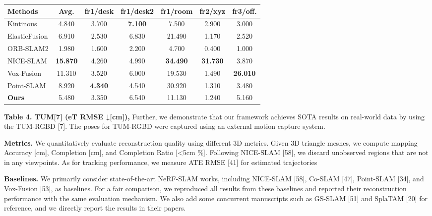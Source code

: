 \documentclass[twocolumn]{article} %
\begin{document}
\begin{table}[htbp]
\centering
\begin{adjustbox}{max width=\columnwidth,max height=!,center}
\begin{tabular}{lcccccc}
\toprule
\textbf{Methods} & \textbf{Avg.} & \textbf{fr1/desk} & \textbf{fr1/desk2} & \textbf{fr1/room} & \textbf{fr2/xyz} & \textbf{fr3/off.}\\
\midrule
Kintinous & 4.840 & \cellcolor{lime!50}3.700 & \cellcolor{green!30}\textbf{7.100} & 7.500 & \cellcolor{yellow!30}2.900 & 3.000\\
ElasticFusion & 6.910 & 2.530 & \cellcolor{yellow!30}6.830 & \cellcolor{lime!50}21.490 & 1.170 & 2.520\\
ORB-SLAM2 & 1.980 & 1.600 & 2.200 & 4.700 & 0.400 & 1.000\\
NICE-SLAM & \cellcolor{green!30}\textbf{15.870} & \cellcolor{yellow!30}4.260 & 4.990 & \cellcolor{green!30}\textbf{34.490} & \cellcolor{green!30}\textbf{31.730} & \cellcolor{lime!50}3.870\\
Vox-Fusion & \cellcolor{yellow!30}11.310 & 3.520 & 6.000 & 19.530 & \cellcolor{lime!50}1.490 & \cellcolor{green!30}\textbf{26.010}\\
Point-SLAM & \cellcolor{lime!50}8.920 & \cellcolor{green!30}\textbf{4.340} & 4.540 & \cellcolor{yellow!30}30.920 & 1.310 & 3.480\\
\midrule
\textbf{Ours} & 5.480 & 3.350 & \cellcolor{lime!50}6.540 & 11.130 & 1.240 & \cellcolor{yellow!30}5.160\\
\bottomrule
\end{tabular}
\end{adjustbox}
\end{table}

\textbf{Table 4. TUM{[}7{]} (eT RMSE ↓{[}cm{]}),} Further, we
demonstrate that our framework achieves SOTA results on real-world data
by using the TUM-RGBD {[}7{]}. The poses for TUM-RGBD were captured
using an external motion capture system.

\textbf{Metrics.} We quantitatively evaluate reconstruction quality
using different 3D metrics. Given 3D triangle meshes, we compute mapping
Accuracy {[}cm{]}, Completion {[}cm{]}, and Completion Ratio
{[}\textless5cm \%{]}. Following NICE-SLAM {[}58{]}, we discard
unobserved regions that are not in any viewpoints. As for tracking
performance, we measure ATE RMSE {[}41{]} for estimated trajectories

\textbf{Baselines.} We primarily consider state-of-the-art NeRF-SLAM
works, including NICE-SLAM {[}58{]}, Co-SLAM {[}47{]}, Point-SLAM
{[}34{]}, and Vox-Fusion {[}53{]}, as baselines. For a fair comparison,
we reproduced all results from these baselines and reported their
reconstruction performance with the same evaluation mechanism. We also
add some concurrent manuscripts such as GS-SLAM {[}51{]} and SplaTAM
{[}20{]} for reference, and we directly report the results in their
papers.
\end{document}

